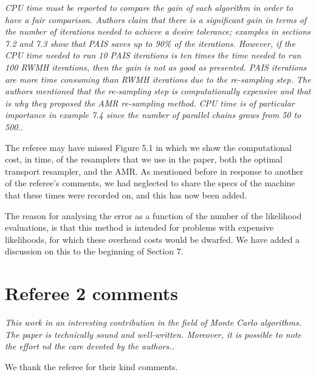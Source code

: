 \documentclass{article}
\newcommand{\comment}[2]{\vspace{0.6cm}{\bf Comment:} {\it #1.}

\vspace{0.3cm}{\bf Answer:} #2}
\begin{document}
\comment{CPU time must be reported to compare the gain of each algorithm in 
order to have a fair comparison. Authors claim that there is a significant 
gain in terms of the number of iterations needed to achieve a desire 
tolerance; examples in sections 7.2 and 7.3 show that PAIS saves up to 90\% of 
the iterations. However, if the CPU time needed to run 10 PAIS iterations is 
ten times the time needed to run 100 RWMH iterations, then the gain is not as 
good as presented. PAIS iterations are more time consuming than RWMH iterations 
due to the re-sampling step. The authors mentioned that the re-sampling step is 
computationally expensive and that is why they proposed the AMR re-sampling 
method. CPU time is of particular importance in example 7.4 since the number of 
parallel chains grows from 50 to 500.}{The referee may have missed Figure 5.1 in which we show the computational cost, in time, of the resamplers that we use in the paper, both the optimal transport resampler, and the AMR. As mentioned before in response to another of the referee's comments, we had neglected to share the specs of the machine that these times were recorded on, and this has now been added. %

The reason for analysing the error as a function of the number of the likelihood evaluations, is that this method is intended for problems with expensive likelihoods, for which these overhead costs would be dwarfed. We have added a discussion on this to the beginning of Section 7.}%



\section*{Referee 2 comments}

\comment{This work in an interesting contribution in the field of Monte Carlo algorithms. The paper is technically sound and well-written. 
Moreover, it is possible to note the effort nd the care devoted by the authors.}{We thank the referee for their kind comments.}
\end{document}
